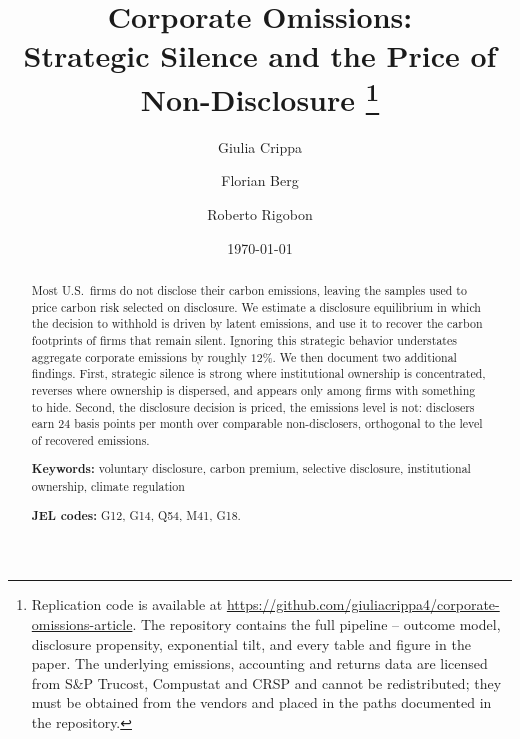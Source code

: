 \documentclass[a4paper,12pt]{article}
\title{Corporate Omissions:\\[4pt]
Strategic Silence and the Price of Non-Disclosure%
\thanks{Replication code is available at \url{https://github.com/giuliacrippa4/corporate-omissions-article}.
The repository contains the full pipeline -- outcome model, disclosure propensity, exponential tilt,
and every table and figure in the paper. The underlying emissions, accounting and returns data are
licensed from S\&P Trucost, Compustat and CRSP and cannot be redistributed; they must be obtained
from the vendors and placed in the paths documented in the repository.}
}
\author[1]{Giulia Crippa}
\author[2]{Florian Berg}
\author[2]{Roberto Rigobon}
\affil[1]{Princeton University}
\affil[2]{MIT Sloan School of Management}
\date{\today}
\newcommand{\citep}[1]{\parencite{#1}}
\begin{document}
\maketitle

\begin{abstract}
\noindent
Most U.S.\ firms do not disclose their carbon emissions, leaving the samples used to price carbon risk selected on disclosure. We estimate a disclosure equilibrium in which the decision to withhold is driven by latent emissions, and use it to recover the carbon footprints of firms that remain silent. Ignoring this strategic behavior understates aggregate corporate emissions by roughly $12\%$. We then document two additional findings. First, strategic silence is strong where institutional ownership is concentrated, reverses where ownership is dispersed, and appears only among firms with something to hide. Second, the disclosure decision is priced, the emissions level is not: disclosers earn $24$ basis points per month over comparable non-disclosers, orthogonal to the level of recovered emissions.


\vspace{6pt}
\noindent\textbf{Keywords:} voluntary disclosure, carbon premium, selective disclosure, institutional ownership, climate regulation

\noindent\textbf{JEL codes:} G12, G14, Q54, M41, G18.
\end{abstract}

\clearpage









\end{document}
